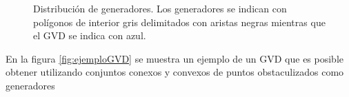 \begin{figure}[H]
  \centering
  \qquad
  \caption[Distribución de generadores.]{Distribución de generadores. Los generadores se indican con polígonos de interior gris delimitados con aristas negras mientras que el GVD se indica con azul.}\label{fig:distriGen}
\end{figure}

En la figura \ref{fig:ejemploGVD} se muestra un ejemplo de un GVD que es posible obtener utilizando 
conjuntos conexos y convexos de puntos obstaculizados como generadores


